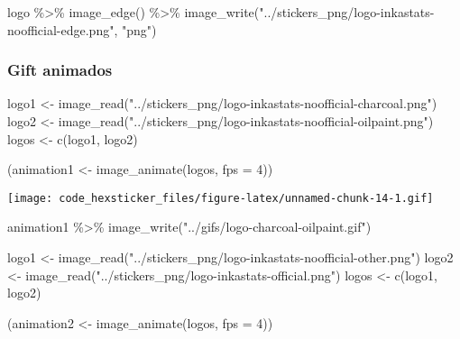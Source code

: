 \documentclass[
]{article}
\newenvironment{Shaded}{\begin{snugshade}}{\end{snugshade}}
\newcommand{\AttributeTok}[1]{\textcolor[rgb]{0.77,0.63,0.00}{#1}}
\newcommand{\DecValTok}[1]{\textcolor[rgb]{0.00,0.00,0.81}{#1}}
\newcommand{\FunctionTok}[1]{\textcolor[rgb]{0.00,0.00,0.00}{#1}}
\newcommand{\NormalTok}[1]{#1}
\newcommand{\OtherTok}[1]{\textcolor[rgb]{0.56,0.35,0.01}{#1}}
\newcommand{\SpecialCharTok}[1]{\textcolor[rgb]{0.00,0.00,0.00}{#1}}
\newcommand{\StringTok}[1]{\textcolor[rgb]{0.31,0.60,0.02}{#1}}
\begin{document}
\begin{Shaded}
\begin{Highlighting}[]
\NormalTok{logo }\SpecialCharTok{\%\textgreater{}\%} 
  \FunctionTok{image\_edge}\NormalTok{() }\SpecialCharTok{\%\textgreater{}\%} 
  \FunctionTok{image\_write}\NormalTok{(}\StringTok{"../stickers\_png/logo{-}inkastats{-}noofficial{-}edge.png"}\NormalTok{, }\StringTok{"png"}\NormalTok{)}
\end{Highlighting}
\end{Shaded}

\hypertarget{gift-animados}{%
\subsubsection{Gift animados}\label{gift-animados}}

\begin{Shaded}
\begin{Highlighting}[]
\NormalTok{logo1 }\OtherTok{\textless{}{-}} \FunctionTok{image\_read}\NormalTok{(}\StringTok{"../stickers\_png/logo{-}inkastats{-}noofficial{-}charcoal.png"}\NormalTok{)}
\NormalTok{logo2 }\OtherTok{\textless{}{-}} \FunctionTok{image\_read}\NormalTok{(}\StringTok{"../stickers\_png/logo{-}inkastats{-}noofficial{-}oilpaint.png"}\NormalTok{)}
\NormalTok{logos }\OtherTok{\textless{}{-}} \FunctionTok{c}\NormalTok{(logo1, logo2)}

\NormalTok{(animation1 }\OtherTok{\textless{}{-}} \FunctionTok{image\_animate}\NormalTok{(logos, }\AttributeTok{fps =} \DecValTok{4}\NormalTok{)) }
\end{Highlighting}
\end{Shaded}

\texttt{[image: code\_hexsticker\_files/figure-latex/unnamed-chunk-14-1.gif]}

\begin{Shaded}
\begin{Highlighting}[]
\NormalTok{animation1 }\SpecialCharTok{\%\textgreater{}\%} 
  \FunctionTok{image\_write}\NormalTok{(}\StringTok{"../gifs/logo{-}charcoal{-}oilpaint.gif"}\NormalTok{)}
\end{Highlighting}
\end{Shaded}

\begin{Shaded}
\begin{Highlighting}[]
\NormalTok{logo1 }\OtherTok{\textless{}{-}} \FunctionTok{image\_read}\NormalTok{(}\StringTok{"../stickers\_png/logo{-}inkastats{-}noofficial{-}other.png"}\NormalTok{)}
\NormalTok{logo2 }\OtherTok{\textless{}{-}} \FunctionTok{image\_read}\NormalTok{(}\StringTok{"../stickers\_png/logo{-}inkastats{-}official.png"}\NormalTok{)}
\NormalTok{logos }\OtherTok{\textless{}{-}} \FunctionTok{c}\NormalTok{(logo1, logo2)}

\NormalTok{(animation2 }\OtherTok{\textless{}{-}} \FunctionTok{image\_animate}\NormalTok{(logos, }\AttributeTok{fps =} \DecValTok{4}\NormalTok{)) }
\end{Highlighting}
\end{Shaded}
\end{document}
